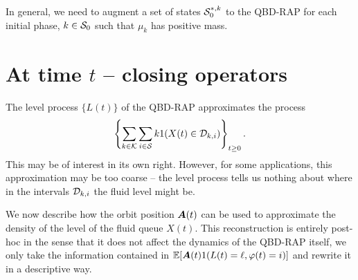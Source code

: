 In general, we need to augment a set of states \(\mathcal{S}_0^{*,k}\) to the QBD-RAP for each initial phase, \(k\in\mathcal{S}_0\) such that \(\mu_k\) has positive mass. 


\section{At time \(t\) -- closing operators}\label{sec: closing}
The level process \(\{L(t)\}\) of the QBD-RAP approximates the process 
\begin{align}
	\displaystyle \left\{\sum_{k\in\mathcal K}\sum_{i\in\mathcal{S}} k1(X(t)\in\mathcal{D}_{k,i})\right\}_{t\geq 0}. \label{eqn: kfafj}
\end{align}
This may be of interest in its own right. However, for some applications, this approximation may be too coarse -- the level process tells us nothing about where in the intervals \(\mathcal{D}_{k,i}\) the fluid level might be. 

We now describe how the orbit position \(\boldsymbol A(t)\) can be used to approximate the density of the level of the fluid queue \(X(t)\). This reconstruction is entirely post-hoc in the sense that it does not affect the dynamics of the QBD-RAP itself, we only take the information contained in \(\mathbb E[\boldsymbol A(t)1(L(t)=\ell,\varphi(t)=i)]\) and rewrite it in a descriptive way. 

